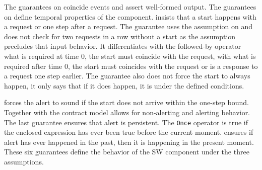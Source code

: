 The guarantees on  coincide events and assert well-formed output.
The guarantees on  define temporal properties of the component.
 insists that a start happens with a request or one step after a request.
The guarantee uses the assumption on  and does not check for two requests in a row without a start as the assumption precludes that input behavior.
It differentiates with the followed-by operator what is required at time 0, the start must coincide with the request, with what is required after time 0, the start must coincides with the request or is a response to a request one step earlier.
The guarantee also does not force the start to always happen, it only says that if it does happen, it is under the defined conditions.

 forces the alert to sound if the start does not arrive within the one-step bound.
Together with  the contract model allows for non-alerting and alerting behavior.
The last guarantee ensures that alert is persistent.
The \texttt{Once} operator is true if the enclosed expression has ever been true before the current moment.
 ensures if alert has ever happened in the past, then it is happening in the present moment.
These six guarantees define the behavior of the SW component under the three assumptions.
